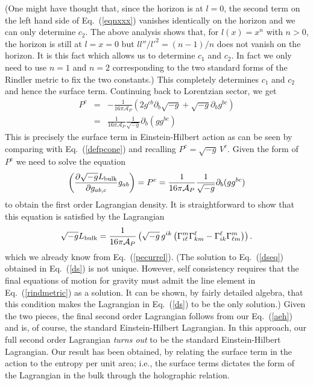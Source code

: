 \documentclass[12pt]{iopart}
\def\eq#1{{Eq.~(\ref{#1})}}
\begin{document}
    (One might have thought that, since the horizon is at $l=0$, the second term
    on the left hand side of \eq{eqnxxx} vanishes identically on the horizon and 
    we can only determine $c_2$. The above analysis shows that, for $l(x) = x^n$
    with $n>0$, the horizon is still at $l=x=0$ but $ll''/l'^2 = (n-1)/n$ does not
    vanish on the horizon. It is this fact which allows us to determine $c_1$ and 
    $c_2$. In fact we only need to use $n=1$ and $n=2$ corresponding to the two standard forms of the Rindler metric to fix the two constants.)
    This completely determines $c_1$ and $c_2$ and hence the surface term. Continuing
    back to Lorentzian sector, we get
    \begin{eqnarray}
        \label{pcfix}
    P^c &=&  - \frac{1}{16\pi \mathcal{A}_P} \left( 2g^{cb} \partial_b \sqrt{-g} + \sqrt{-g} \partial_b g^{bc}\right) 
     \nonumber\\
    &=& \frac{1}{16\pi \mathcal{A}_P}\frac{1}{\sqrt{-g}} \partial_b(gg^{bc})
    \end{eqnarray}    
    This is precisely the surface term in Einstein-Hilbert action as can be seen by comparing with \eq{defpcone} and recalling $P^c = \sqrt{-g}\, V^c$.
        Given the form of $P^c$ we need to solve the 
   equation   
    \begin{equation}
 \left(\frac{\partial \sqrt{-g}L_{\rm bulk}}{\partial g_{ab,c}}g_{ab}\right)=
 P^c=  \frac{1}{ 16\pi \mathcal{A}_P}\frac{1}{\sqrt{-g}} \partial_b(gg^{bc})
 \label{dseq}
\end{equation}
to obtain 
the first order Lagrangian density.
    It is straightforward to show that this equation is satisfied by the Lagrangian
\begin{equation}
\sqrt{-g}L_{\rm bulk}  = 
 \frac{1}{ 16\pi \mathcal{A}_P} \left(\sqrt{-g} \, g^{ik} \left(\Gamma^m_{i\ell}\Gamma^\ell_{km} -
\Gamma^\ell_{ik} \Gamma^m_{\ell m}\right)\right).
\label{ds}
\end{equation}  
which we already know from \eq{pecurrel}. 
(The solution to Eq.~(\ref{dseq}) obtained in Eq.~(\ref{ds}) is not unique. However, self consistency requires that the final equations of motion for gravity must admit the line element in  Eq.~(\ref{rindmetric}) as a solution.  It can be shown, by fairly detailed algebra, that this condition makes the Lagrangian in Eq.~(\ref{ds}) to be the only solution.) 
    Given the two pieces, the final second order Lagrangian follows from our Eq.~(\ref{aeh})
    and is, of course, the standard Einstein-Hilbert Lagrangian.
    In this approach, 
     our full second order Lagrangian  {\it turns out} to be the standard 
Einstein-Hilbert Lagrangian.
Our result has been obtained,
by relating the surface term in the action  to the entropy per unit area; i.e., the surface terms dictates the form of the  Lagrangian in the bulk through the holographic relation. 
\end{document}
